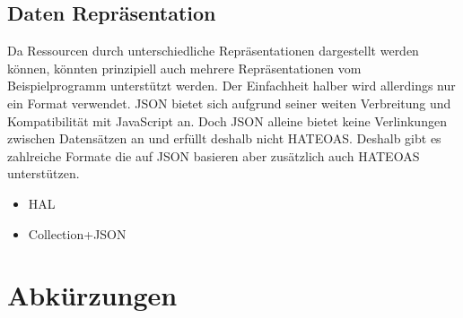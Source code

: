 \documentclass[listof=totoc]{article}
\begin{document}
	\subsection{Daten Repräsentation}
	Da Ressourcen durch unterschiedliche Repräsentationen dargestellt werden können, könnten prinzipiell auch mehrere Repräsentationen vom Beispielprogramm unterstützt werden. Der Einfachheit halber wird allerdings nur ein Format verwendet.
	\ac{JSON} bietet sich aufgrund seiner weiten Verbreitung und Kompatibilität mit JavaScript an. Doch \ac{JSON} alleine bietet keine Verlinkungen zwischen Datensätzen an und erfüllt deshalb nicht \ac{HATEOAS}. Deshalb gibt es zahlreiche Formate die auf \ac{JSON} basieren aber zusätzlich auch \ac{HATEOAS} unterstützen. \cite{HATEOAS_FORMATS}
	\begin{itemize} 
		\setlength{\itemsep}{0pt} 
		\item HAL
		\item Collection+JSON
	\end{itemize}
	
	\newpage
	
	\setcounter{secnumdepth}{0}	%
	\section{Abkürzungen}
	\begin{acronym}[HATEOAS]
	\end{acronym}
	\newpage

	

	
	
\end{document}
